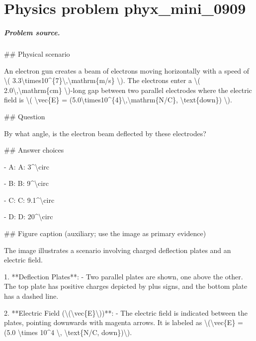 
\chapter{Physics problem phyx\_mini\_0909}
\label{ch:PhyXMiniProblems_problem_phyx_mini_0909}

\paragraph{Problem source.}
\#\# Physical scenario

An electron gun creates a beam of electrons moving horizontally with a speed of \textbackslash{}( 3.3\textbackslash{}times10\textasciicircum{}\{7\}\textbackslash{},\textbackslash{}mathrm\{m/s\} \textbackslash{}). The electrons enter a \textbackslash{}( 2.0\textbackslash{},\textbackslash{}mathrm\{cm\} \textbackslash{})-long gap between two parallel electrodes where the electric field is \textbackslash{}( \textbackslash{}vec\{E\} = (5.0\textbackslash{}times10\textasciicircum{}\{4\}\textbackslash{},\textbackslash{}mathrm\{N/C\}, \textbackslash{}text\{down\}) \textbackslash{}).

\#\# Question

By what angle, is the electron beam deflected by these electrodes?

\#\# Answer choices

- A: A: 3\textasciicircum{}\textbackslash{}circ

- B: B: 9\textasciicircum{}\textbackslash{}circ

- C: C: 9.1\textasciicircum{}\textbackslash{}circ

- D: D: 20\textasciicircum{}\textbackslash{}circ

\#\# Figure caption (auxiliary; use the image as primary evidence)

The image illustrates a scenario involving charged deflection plates and an electric field. 

1. **Deflection Plates**: 
   - Two parallel plates are shown, one above the other. The top plate has positive charges depicted by plus signs, and the bottom plate has a dashed line.

2. **Electric Field (\textbackslash{}(\textbackslash{}vec\{E\}\textbackslash{}))**: 
   - The electric field is indicated between the plates, pointing downwards with magenta arrows. It is labeled as \textbackslash{}(\textbackslash{}vec\{E\} = (5.0 \textbackslash{}times 10\textasciicircum{}4 \textbackslash{}, \textbackslash{}text\{N/C, down\})\textbackslash{}).

